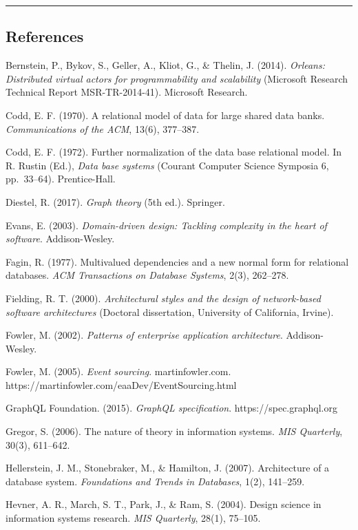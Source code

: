 \documentclass[
]{article}
\begin{document}
\begin{center}\rule{0.5\linewidth}{0.5pt}\end{center}

\subsection{References}\label{references}

Bernstein, P., Bykov, S., Geller, A., Kliot, G., \& Thelin, J. (2014).
\emph{Orleans: Distributed virtual actors for programmability and
scalability} (Microsoft Research Technical Report MSR-TR-2014-41).
Microsoft Research.

Codd, E. F. (1970). A relational model of data for large shared data
banks. \emph{Communications of the ACM}, 13(6), 377--387.

Codd, E. F. (1972). Further normalization of the data base relational
model. In R. Rustin (Ed.), \emph{Data base systems} (Courant Computer
Science Symposia 6, pp.~33--64). Prentice-Hall.

Diestel, R. (2017). \emph{Graph theory} (5th ed.). Springer.

Evans, E. (2003). \emph{Domain-driven design: Tackling complexity in the
heart of software}. Addison-Wesley.

Fagin, R. (1977). Multivalued dependencies and a new normal form for
relational databases. \emph{ACM Transactions on Database Systems}, 2(3),
262--278.

Fielding, R. T. (2000). \emph{Architectural styles and the design of
network-based software architectures} (Doctoral dissertation, University
of California, Irvine).

Fowler, M. (2002). \emph{Patterns of enterprise application
architecture}. Addison-Wesley.

Fowler, M. (2005). \emph{Event sourcing}. martinfowler.com.
https://martinfowler.com/eaaDev/EventSourcing.html

GraphQL Foundation. (2015). \emph{GraphQL specification}.
https://spec.graphql.org

Gregor, S. (2006). The nature of theory in information systems.
\emph{MIS Quarterly}, 30(3), 611--642.

Hellerstein, J. M., Stonebraker, M., \& Hamilton, J. (2007).
Architecture of a database system. \emph{Foundations and Trends in
Databases}, 1(2), 141--259.

Hevner, A. R., March, S. T., Park, J., \& Ram, S. (2004). Design science
in information systems research. \emph{MIS Quarterly}, 28(1), 75--105.
\end{document}
